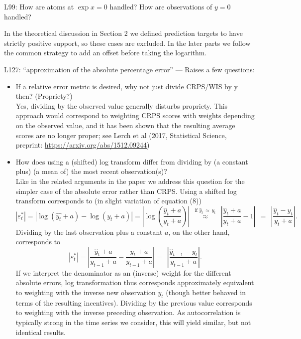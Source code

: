 \documentclass{article}
\newcommand{\black}{\color{black}}
\newcommand{\blue}{\color{blue}}
\begin{document}
\blue
L99: How are atoms at $\exp x = 0$ handled? How are observations of $y = 0$ handled?

\black
In the theoretical discussion in Section 2 we defined prediction targets to have strictly positive support, so these cases are excluded. In the later parts we follow the common strategy to add an offset before taking the logarithm. 

\blue

L127: “approximation of the absolute percentage error” — Raises a few questions:
\begin{itemize}
    \item If a relative error metric is desired, why not just divide CRPS/WIS by y then? (Propriety?)\\
    \black
Yes, dividing by the observed value generally disturbs propriety. This approach would correspond to weighting CRPS scores with weights depending on the observed value, and it has been shown that the resulting average scores are no longer proper; see Lerch et al (2017, Statistical Science, preprint: \url{https://arxiv.org/abs/1512.09244})
    \item \blue How does using a (shifted) log transform differ from dividing by (a constant plus) (a mean of) the most recent observation(s)?\\
    \black Like in the related arguments in the paper we address this question for the simpler case of the absolute error rather than CRPS. Using a shifted log transform corresponds to (in slight variation of equation (8))
    \begin{equation}
    |\varepsilon^*_t| = |\log (\hat{y_t} + a) - \log(y_t + a)| = \left|\log\left(\frac{\hat{y}_t + a}{y_t + a}\right) \right| \ \ \stackrel{\text{if } \hat{y}_t \ \approx \ y_t}{\approx} \ \ \left| \frac{\hat{y}_t + a}{y_t + a} - 1 \right| \ \ = \ \ \left| \frac{\hat{y}_t - y_t}{y_t + a} \right|.
    \end{equation}
    Dividing by the last observation plus a constant $a$, on the other hand, corresponds to
    \begin{equation}
    |\varepsilon^*_t| = \left|\frac{\hat{y}_t + a}{y_{t - 1} + a} - \frac{y_t + a}{y_{t - 1} + a} \right| = \ \ \left| \frac{\hat{y}_{t - 1} - y_t}{y_{t - 1} + a} \right|.
    \end{equation}
    If we interpret the denominator as an (inverse) weight for the different absolute errors, log transformation thus corresponds approximately equivalent to weighting with the inverse new observation $y_t$ (though better behaved in terms of the resulting incentives). Dividing by the previous value corresponds to weighting with the inverse preceding observation. As autocorrelation is typically strong in the time series we consider, this will yield similar, but not identical results.\\

\end{itemize}
\end{document}
